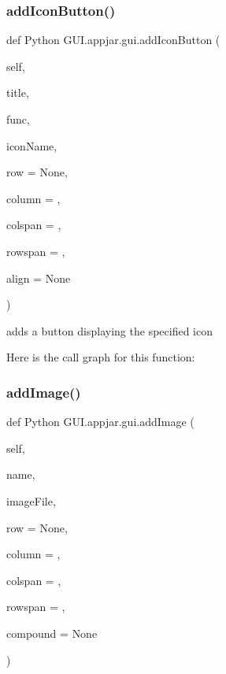 \subsubsection{\texorpdfstring{add\+Icon\+Button()}{addIconButton()}}
{\footnotesize\ttfamily def Python G\+U\+I.\+appjar.\+gui.\+add\+Icon\+Button (\begin{DoxyParamCaption}\item[{}]{self,  }\item[{}]{title,  }\item[{}]{func,  }\item[{}]{icon\+Name,  }\item[{}]{row = {\ttfamily None},  }\item[{}]{column = {},  }\item[{}]{colspan = {},  }\item[{}]{rowspan = {},  }\item[{}]{align = {\ttfamily None} }\end{DoxyParamCaption})}

\begin{DoxyVerb}adds a button displaying the specified icon \end{DoxyVerb}
 Here is the call graph for this function\+:
\mbox{\label{class_python_01_g_u_i_1_1appjar_1_1gui_ad04d73503d989881bdf2803d5546891d}} 
\subsubsection{\texorpdfstring{add\+Image()}{addImage()}}
{\footnotesize\ttfamily def Python G\+U\+I.\+appjar.\+gui.\+add\+Image (\begin{DoxyParamCaption}\item[{}]{self,  }\item[{}]{name,  }\item[{}]{image\+File,  }\item[{}]{row = {\ttfamily None},  }\item[{}]{column = {},  }\item[{}]{colspan = {},  }\item[{}]{rowspan = {},  }\item[{}]{compound = {\ttfamily None} }\end{DoxyParamCaption})}

